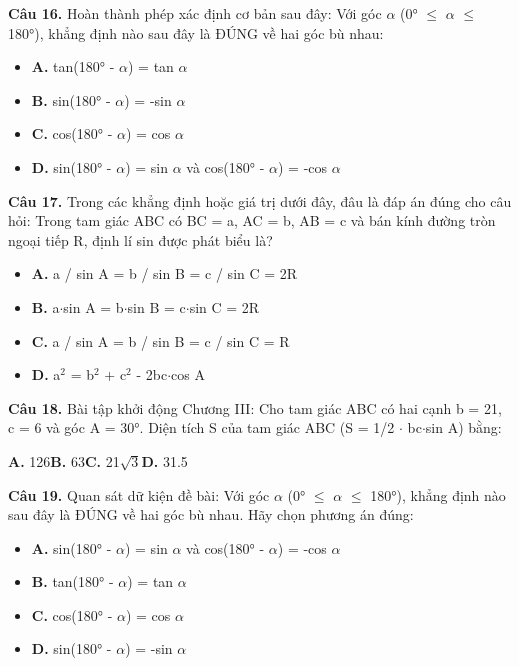 \documentclass[11pt,a4paper]{article}
\begin{document}
\textbf{\color{primary} Câu 16.} Hoàn thành phép xác định cơ bản sau đây: Với góc $\alpha$ (0° $\le$ $\alpha$ $\le$ 180°), khẳng định nào sau đây là ĐÚNG về hai góc bù nhau:\par
\begin{itemize}\setlength{\itemsep}{1pt}\setlength{\parskip}{0pt}
  \item[] \textbf{A.} tan(180° - $\alpha$) = tan $\alpha$
  \item[] \textbf{B.} sin(180° - $\alpha$) = -sin $\alpha$
  \item[] \textbf{C.} cos(180° - $\alpha$) = cos $\alpha$
  \item[] \textbf{D.} sin(180° - $\alpha$) = sin $\alpha$ và cos(180° - $\alpha$) = -cos $\alpha$
\end{itemize}\vspace{2pt}
\textbf{\color{primary} Câu 17.} Trong các khẳng định hoặc giá trị dưới đây, đâu là đáp án đúng cho câu hỏi: Trong tam giác ABC có BC = a, AC = b, AB = c và bán kính đường tròn ngoại tiếp R, định lí sin được phát biểu là?\par
\begin{itemize}\setlength{\itemsep}{1pt}\setlength{\parskip}{0pt}
  \item[] \textbf{A.} a / sin A = b / sin B = c / sin C = 2R
  \item[] \textbf{B.} a$\cdot$sin A = b$\cdot$sin B = c$\cdot$sin C = 2R
  \item[] \textbf{C.} a / sin A = b / sin B = c / sin C = R
  \item[] \textbf{D.} a$^2$ = b$^2$ + c$^2$ - 2bc$\cdot$cos A
\end{itemize}\vspace{2pt}
\textbf{\color{primary} Câu 18.} Bài tập khởi động Chương III: Cho tam giác ABC có hai cạnh b = 21, c = 6 và góc A = 30°. Diện tích S của tam giác ABC (S = 1/2 $\cdot$ bc$\cdot$sin A) bằng:\par
\hspace*{1.5em}\textbf{A.} 126\quad\quad \textbf{B.} 63\quad\quad \textbf{C.} 21$\sqrt{3}$\quad\quad \textbf{D.} 31.5\par\vspace{2pt}
\textbf{\color{primary} Câu 19.} Quan sát dữ kiện đề bài: Với góc $\alpha$ (0° $\le$ $\alpha$ $\le$ 180°), khẳng định nào sau đây là ĐÚNG về hai góc bù nhau. Hãy chọn phương án đúng:\par
\begin{itemize}\setlength{\itemsep}{1pt}\setlength{\parskip}{0pt}
  \item[] \textbf{A.} sin(180° - $\alpha$) = sin $\alpha$ và cos(180° - $\alpha$) = -cos $\alpha$
  \item[] \textbf{B.} tan(180° - $\alpha$) = tan $\alpha$
  \item[] \textbf{C.} cos(180° - $\alpha$) = cos $\alpha$
  \item[] \textbf{D.} sin(180° - $\alpha$) = -sin $\alpha$
\end{itemize}\vspace{2pt}
\end{document}
